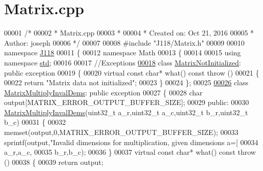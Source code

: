 \hypertarget{_matrix_8cpp_source}{}\section{Matrix.\+cpp}
\label{_matrix_8cpp_source}

\begin{DoxyCode}
00001 \textcolor{comment}{/*}
00002 \textcolor{comment}{ * Matrix.cpp}
00003 \textcolor{comment}{ *}
00004 \textcolor{comment}{ *  Created on: Oct 21, 2016}
00005 \textcolor{comment}{ *      Author: joseph}
00006 \textcolor{comment}{ */}
00007 
00008 \textcolor{preprocessor}{#include "J118/Matrix.h"}
00009 
00010 \textcolor{keyword}{namespace }\hyperlink{namespace_j118}{J118}
00011 \{
00012 \textcolor{keyword}{namespace }Math
00013 \{
00014 
00015 \textcolor{keyword}{using namespace }\hyperlink{namespacestd}{std};
00016 
00017 \textcolor{comment}{//Exceptions}
\hypertarget{_matrix_8cpp_source_l00018}{}\hyperlink{class_j118_1_1_math_1_1_matrix_not_initialized}{00018} \textcolor{keyword}{class }\hyperlink{class_j118_1_1_math_1_1_matrix_not_initialized}{MatrixNotInitialized}: \textcolor{keyword}{public} exception
00019 \{
00020     \textcolor{keyword}{virtual} \textcolor{keyword}{const} \textcolor{keywordtype}{char}* what() \textcolor{keyword}{const} \textcolor{keywordflow}{throw} ()
00021     \{
00022         \textcolor{keywordflow}{return} \textcolor{stringliteral}{"Matrix data not initialized"};
00023     \}
00024 \};
00025 
\hypertarget{_matrix_8cpp_source_l00026}{}\hyperlink{class_j118_1_1_math_1_1_matrix_multiply_inval_dems}{00026} \textcolor{keyword}{class }\hyperlink{class_j118_1_1_math_1_1_matrix_multiply_inval_dems}{MatrixMultiplyInvalDems}: \textcolor{keyword}{public} exception
00027 \{
00028     \textcolor{keywordtype}{char} output[MATRIX\_ERROR\_OUTPUT\_BUFFER\_SIZE];
00029 \textcolor{keyword}{public}:
00030     \hyperlink{class_j118_1_1_math_1_1_matrix_multiply_inval_dems}{MatrixMultiplyInvalDems}(uint32\_t a\_r,uint32\_t a\_c,uint32\_t b\_r,uint32\_t b\_c)
00031     \{
00032         memset(output,0,MATRIX\_ERROR\_OUTPUT\_BUFFER\_SIZE);
00033         sprintf(output,\textcolor{stringliteral}{"Invalid dimensions for multiplication, given dimensions a=[%
00034                 a\_r,a\_c,
00035                 b\_r,b\_c);
00036     \}
00037     \textcolor{keyword}{virtual} \textcolor{keyword}{const} \textcolor{keywordtype}{char}* what() \textcolor{keyword}{const} \textcolor{keywordflow}{throw} ()
00038     \{
00039         \textcolor{keywordflow}{return} output;
}
\end{DoxyCode}
